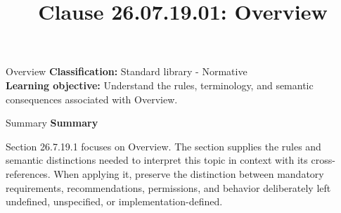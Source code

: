 \documentclass[10pt,letterpaper]{article}
\title{Clause 26.07.19.01: Overview}
\author{}
\date{}
\begin{document}
\maketitle
\begin{CornellOverviewBox}{Overview}
\textbf{Classification:} Standard library - Normative\\[2pt]
\textbf{Learning objective:} Understand the rules, terminology, and semantic consequences associated with Overview.
\end{CornellOverviewBox}\begin{CornellSummaryBox}{Summary}
{\sffamily\bfseries\color{Accent} Summary}\par\vspace{3pt}Section 26.7.19.1 focuses on Overview. The section supplies the rules and semantic distinctions needed to interpret this topic in context with its cross-references. When applying it, preserve the distinction between mandatory requirements, recommendations, permissions, and behavior deliberately left undefined, unspecified, or implementation-defined.
\end{CornellSummaryBox}
\end{document}
